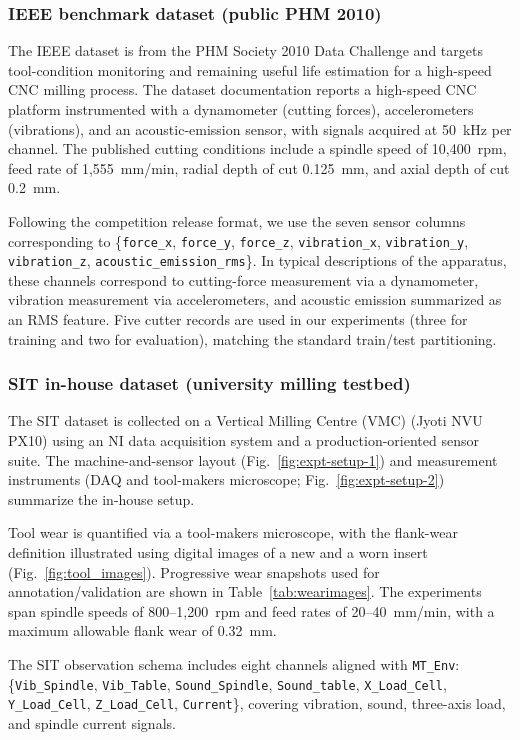 \documentclass[sn-basic]{sn-jnl} %
\begin{document}
\subsubsection{IEEE benchmark dataset (public PHM 2010)}
The IEEE dataset \cite{PHMdata2010} is from the PHM Society 2010 Data Challenge and targets tool-condition monitoring and remaining useful life estimation for a high-speed CNC milling process. The dataset documentation reports a high-speed CNC platform instrumented with a dynamometer (cutting forces), accelerometers (vibrations), and an acoustic-emission sensor, with signals acquired at 50~kHz per channel. The published cutting conditions include a spindle speed of 10{,}400~rpm, feed rate of 1{,}555~mm/min, radial depth of cut 0.125~mm, and axial depth of cut 0.2~mm.

Following the competition release format, we use the seven sensor columns corresponding to \{\texttt{force\_x}, \texttt{force\_y}, \texttt{force\_z}, \texttt{vibration\_x}, \texttt{vibration\_y}, \texttt{vibration\_z}, \texttt{acoustic\_emission\_rms}\}. In typical descriptions of the apparatus, these channels correspond to cutting-force measurement via a dynamometer, vibration measurement via accelerometers, and acoustic emission summarized as an RMS feature. Five cutter records are used in our experiments (three for training and two for evaluation), matching the standard train/test partitioning.

\subsubsection{SIT in-house dataset (university milling testbed)}
The SIT dataset is collected on a Vertical Milling Centre (VMC) (Jyoti NVU PX10) using an NI data acquisition system and a production-oriented sensor suite. The machine-and-sensor layout (Fig.~\ref{fig:expt-setup-1}) and measurement instruments (DAQ and tool-makers microscope; Fig.~\ref{fig:expt-setup-2}) summarize the in-house setup.

Tool wear is quantified via a tool-makers microscope, with the flank-wear definition illustrated using digital images of a new and a worn insert (Fig.~\ref{fig:tool_images}). Progressive wear snapshots used for annotation/validation are shown in Table~\ref{tab:wearimages}. The experiments span spindle speeds of 800--1{,}200~rpm and feed rates of 20--40~mm/min, with a maximum allowable flank wear of 0.32~mm.

The SIT observation schema includes eight channels aligned with \texttt{MT\_Env}: \{\texttt{Vib\_Spindle}, \texttt{Vib\_Table}, \texttt{Sound\_Spindle}, \texttt{Sound\_table}, \texttt{X\_Load\_Cell}, \texttt{Y\_Load\_Cell}, \texttt{Z\_Load\_Cell}, \texttt{Current}\}, covering vibration, sound, three-axis load, and spindle current signals.
\end{document}
